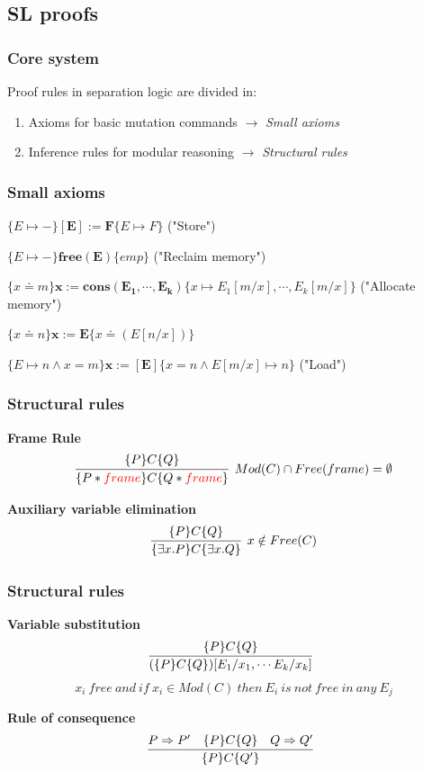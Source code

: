 \documentclass{beamer}
\begin{document}
    \subsection{SL proofs}
        \begin{frame}
            \frametitle{Core system}
            Proof rules in separation logic  are divided in:\begin{enumerate}
                \item Axioms for basic mutation commands $\rightarrow$ \emph{Small axioms}
                \item Inference rules for modular reasoning $\rightarrow$ \emph{Structural rules}
            \end{enumerate}
        \end{frame}
        \begin{frame}
            \frametitle{Small axioms}
             
            \pause
            $\{E \mapsto - \}\mathbf{[E] := F}\{ E \mapsto F \} $ ("Store")
            
            \bigskip
            \pause
            $ \{E \mapsto -\} \mathbf{free(E)} \{emp\}$ ("Reclaim memory")
           
            \bigskip
            \pause 
            $ \{x\doteq m \}\mathbf{x:=cons(E_1,\cdots,E_k)} \{x \mapsto E_1[m/x],\cdots, E_k[m/x]\}$ ("Allocate memory")
            
            \bigskip
            \pause 
            $ \{x \doteq n\}\mathbf{x := E} \{ x \doteq (E[n/x])\}$ 
            
            \bigskip
            \pause 
            $ \{E \mapsto n \wedge  x = m\}\mathbf{x:=[E]} \{x=n \wedge E[m/x] \mapsto n\}$  ("Load")
    
           
        \end{frame}
        \begin{frame}
            \frametitle{Structural rules}
            \scriptsize
            \textbf{Frame Rule}
            $$
            \infer[Mod(C) \cap  Free(frame) = \emptyset]
            {\{P \ast \textcolor{red}{frame}\}C\{Q \ast \textcolor{red}{frame}\}}
            {\{P\}C\{Q\}}$$

            \pause
            \textbf{Auxiliary variable elimination}
            $$
            \infer[x \notin Free(C)]
            {\{\exists x.P\}C\{\exists x.Q\}}
            {\{P\}C\{Q\} }
            $$
        \end{frame}
        \begin{frame}
            \frametitle{Structural rules}
            \scriptsize
           \textbf{Variable substitution}
           $$
           \infer[]
           {(\{P\}C\{Q\})[E_1 / x_1, \cdots E_k /x_k] }
           {\{P\}C\{Q\} }$$
           $$
           x_i\ free\ and\ if\ x_i \in Mod(C)\ then\ E_i\ is\ not\ free\ in\ any\ E_j$$
           
           \pause
           \textbf{Rule of consequence}
            $$
            \infer[]
            {\{P\}C\{Q'\}}
            {P \Rightarrow P' \quad \{P\}C\{Q\} \quad Q \Rightarrow Q'}$$
        
        \end{frame}
\end{document}
